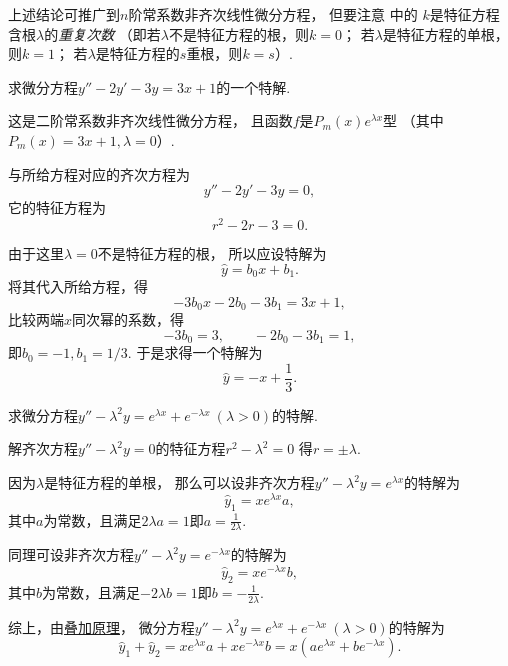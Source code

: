 上述结论可推广到\(n\)阶常系数非齐次线性微分方程，
但要注意  中的
\(k\)是特征方程含根\(\lambda\)的\emph{重复次数}
（即若\(\lambda\)不是特征方程的根，则\(k=0\)；
若\(\lambda\)是特征方程的单根，则\(k=1\)；
若\(\lambda\)是特征方程的\(s\)重根，则\(k=s\)）.

\begin{example}
求微分方程\(y''-2y'-3y=3x+1\)的一个特解.
\begin{solution}
这是二阶常系数非齐次线性微分方程，
且函数\(f\)是\(P_m(x) e^{\lambda x}\)型
（其中\(P_m(x) = 3x+1, \lambda=0\)）.

与所给方程对应的齐次方程为\[
	y''-2y'-3y=0,
\]
它的特征方程为\[
	r^2-2r-3=0.
\]

由于这里\(\lambda=0\)不是特征方程的根，
所以应设特解为\[
	\hat{y} = b_0 x + b_1.
\]
将其代入所给方程，得\[
	-3 b_0 x - 2 b_0 - 3 b_1 = 3x+1,
\]
比较两端\(x\)同次幂的系数，得\[
	-3 b_0 = 3, \qquad -2 b_0 - 3 b_1 = 1,
\]
即\(b_0=-1, b_1=1/3\).
于是求得一个特解为\[
	\hat{y} = -x + \frac{1}{3}.
\]
\end{solution}
\end{example}

\begin{example}
求微分方程\(y'' - \lambda^2 y = e^{\lambda x} + e^{-\lambda x}\ (\lambda>0)\)的特解.
\begin{solution}
解齐次方程\(y'' - \lambda^2 y = 0\)的特征方程\(r^2 - \lambda^2 = 0\)
得\(r = \pm\lambda\).

因为\(\lambda\)是特征方程的单根，
那么可以设非齐次方程\(y'' - \lambda^2 y = e^{\lambda x}\)的特解为\[
	\hat{y}_1 = x e^{\lambda x} a,
\]
其中\(a\)为常数，且满足\(2\lambda a = 1\)即\(a = \frac{1}{2\lambda}\).

同理可设非齐次方程\(y'' - \lambda^2 y = e^{-\lambda x}\)的特解为\[
	\hat{y}_2 = x e^{-\lambda x} b,
\]
其中\(b\)为常数，且满足\(-2\lambda b = 1\)即\(b = -\frac{1}{2\lambda}\).

综上，由\hyperref[theorem:微分方程.二阶非齐次线性微分方程的解的叠加原理]{叠加原理}，
微分方程\(y'' - \lambda^2 y = e^{\lambda x} + e^{-\lambda x}\ (\lambda>0)\)的特解为\[
	\hat{y}_1 + \hat{y}_2 = x e^{\lambda x} a + x e^{-\lambda x} b
	= x(a e^{\lambda x} + b e^{-\lambda x}).
\]
\end{solution}
\end{example}

